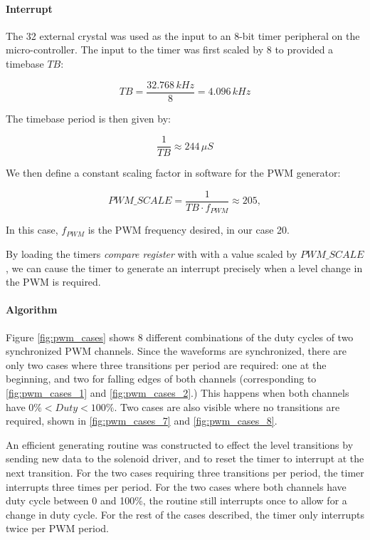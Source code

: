 \paragraph{Interrupt} The \unit{32}{\kilo\hertz} external crystal was used as the input to an 8-bit timer peripheral on the micro-controller. The input to the timer was first scaled by 8 to provided a timebase $TB$:

\begin{equation}
TB=\frac{32.768\, kHz}{8}=4.096\, kHz
\end{equation}

The timebase period is then given by:

\begin{equation}
\frac{1}{TB}\approx244\,\mu{S}
\end{equation}

We then define a constant scaling factor in software for the PWM generator:

\begin{equation}
{PWM\_SCALE}=\frac{1}{TB\cdot{f_{PWM}}}\approx205,
\end{equation}

In this case, $f_{PWM}$ is the PWM frequency desired, in our case \unit{20}{\hertz}.

By loading the timers \emph{compare register} with with a value scaled by ${PWM\_SCALE}$, we can cause the timer to generate an interrupt precisely when a level change in the PWM is required.

\paragraph{Algorithm}

Figure \ref{fig:pwm_cases} shows 8 different combinations of the duty cycles of two synchronized PWM channels. Since the waveforms are synchronized, there are only two cases where three transitions per period are required: one at the beginning, and two for falling edges of both channels (corresponding to \ref{fig:pwm_cases_1} and \ref{fig:pwm_cases_2}.) This happens when both channels have $0\%<Duty<100\%$. Two cases are also visible where no transitions are required, shown in \ref{fig:pwm_cases_7} and \ref{fig:pwm_cases_8}.

An efficient generating routine was constructed to effect the level transitions by sending new data to the solenoid driver, and to reset the timer to interrupt at the next transition. For the two cases requiring three transitions per period, the timer interrupts three times per period. For the two cases where both channels have duty cycle between 0 and 100\%, the routine still interrupts once to allow for a change in duty cycle. For the rest of the cases described, the timer only interrupts twice per PWM period.

